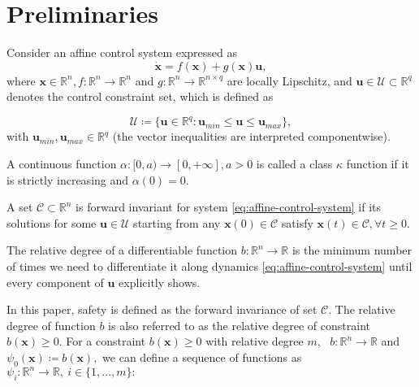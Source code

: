 \section{Preliminaries}
\label{sec:preliminaries}

Consider an affine control system expressed as 
\begin{equation}
\label{eq:affine-control-system}
\dot{\boldsymbol{x}}=f(\boldsymbol{x})+g(\boldsymbol{x})\boldsymbol{u},
\end{equation}
 where $\boldsymbol{x}\in \mathbb{R}^{n}, f:\mathbb{R}^{n}\to\mathbb{R}^{n}$ and $g:\mathbb{R}^{n}\to\mathbb{R}^{n\times q}$ are locally Lipschitz, and $\boldsymbol{u}\in \mathcal U\subset \mathbb{R}^{q}$ denotes the control constraint set, which is defined as 
 
\begin{equation}
\label{eq:control-constraint}
\mathcal U \coloneqq \{\boldsymbol{u}\in \mathbb{R}^{q}:\boldsymbol{u}_{min}\le \boldsymbol{u} \le \boldsymbol{u}_{max} \}, \end{equation}
 with $\boldsymbol{u}_{min},\boldsymbol{u}_{max}\in \mathbb{R}^{q}$ (the vector inequalities are interpreted componentwise).
 
\begin{definition}
\label{def:class-k-f}
A continuous function $\alpha:[0,a)\to[0,+\infty],a>0$ is called a class $\kappa$ function if it is strictly increasing and $\alpha(0)=0.$
\end{definition}

\begin{definition}
\label{def:forward-inv}
A set $\mathcal C\subset \mathbb{R}^{n}$ is forward invariant for system \eqref{eq:affine-control-system} if its solutions for some $\boldsymbol{u} \in \mathcal U$ starting from any $\boldsymbol{x}(0) \in \mathcal C$ satisfy $\boldsymbol{x}(t) \in \mathcal C, \forall t \ge 0.$
\end{definition}

\begin{definition}
\label{def:relative-degree}
The relative degree of a differentiable function $b:\mathbb{R}^{n}\to\mathbb{R}$ is the minimum number of times we need to differentiate it along dynamics \eqref{eq:affine-control-system} until every component of $\boldsymbol{u}$ explicitly shows. 
\end{definition}

In this paper, safety is defined as the forward invariance of set $\mathcal C$. The relative degree of function $b$ is also referred to as the relative degree of constraint $b(\boldsymbol{x}) \ge 0$. For a constraint $b(\boldsymbol{x})\ge0$ with relative degree $m$, \ $b:\mathbb{R}^{n}\to\mathbb{R}$ and $\psi_{0}(\boldsymbol{x})\coloneqq b(\boldsymbol{x}),$ we can define a sequence of functions as $\psi_{i}:\mathbb{R}^{n}\to\mathbb{R},\ i\in \{1,...,m\}:$

